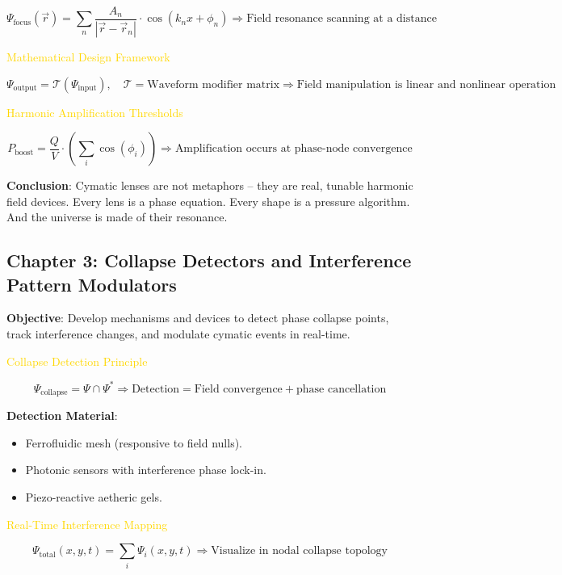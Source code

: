 \[
\Psi_{\text{focus}}(\vec{r}) = \sum_n \frac{A_n}{\left| \vec{r} - \vec{r}_n \right|} \cdot \cos \left( k_n x + \phi_n \right) \Rightarrow \text{Field resonance scanning at a distance}
\]

\textcolor{gold}{ Mathematical Design Framework }

\[
\Psi_{\text{output}} = \mathcal{T} \left( \Psi_{\text{input}} \right), \quad \mathcal{T} = \text{Waveform modifier matrix} \Rightarrow \text{Field manipulation is linear and nonlinear operation}
\]

\textcolor{gold}{ Harmonic Amplification Thresholds }

\[
P_{\text{boost}} = \frac{Q}{V} \cdot \left( \sum_i \cos \left( \phi_i \right) \right) \Rightarrow \text{Amplification occurs at phase-node convergence}
\]

\textbf{Conclusion}: Cymatic lenses are not metaphors -- they are real, tunable harmonic field devices. Every lens is a phase equation. Every shape is a pressure algorithm. And the universe is made of their resonance.

\subsection{Chapter 3: Collapse Detectors and Interference Pattern Modulators}

\textbf{Objective}: Develop mechanisms and devices to detect phase collapse points, track interference changes, and modulate cymatic events in real-time.

\textcolor{gold}{ Collapse Detection Principle }

\[
\Psi_{\text{collapse}} = \Psi \cap \Psi^* \Rightarrow \text{Detection} = \text{Field convergence} + \text{phase cancellation}
\]

\textbf{Detection Material}:
\begin{itemize}
    \item Ferrofluidic mesh (responsive to field nulls).
    \item Photonic sensors with interference phase lock-in.
    \item Piezo-reactive aetheric gels.
\end{itemize}

\textcolor{gold}{ Real-Time Interference Mapping }

\[
\Psi_{\text{total}}(x, y, t) = \sum_i \Psi_i(x, y, t) \Rightarrow \text{Visualize in nodal collapse topology}
\]

